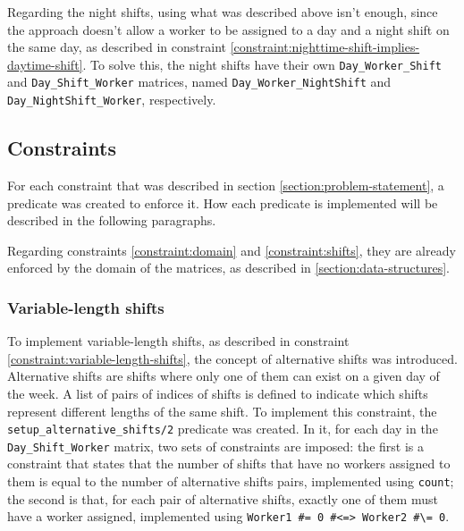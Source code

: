 \documentclass[conference]{IEEEtran}
\def\constraint#1{\vspace{4pt} {#1}}
\begin{document}
Regarding the night shifts, using what was described above isn't enough, since the approach doesn't allow a worker to be assigned to a day and a night shift on the same day, as described in constraint \ref{constraint:nighttime-shift-implies-daytime-shift}.
To solve this, the night shifts have their own \texttt{Day\_Worker\_Shift} and \texttt{Day\_Shift\_Worker} matrices, named \texttt{Day\_Worker\_NightShift} and \texttt{Day\_NightShift\_Worker}, respectively.

\subsection{Constraints}
\label{section:constraints}

For each constraint that was described in section \ref{section:problem-statement}, a predicate was created to enforce it. How each predicate is implemented will be described in the following paragraphs.

Regarding constraints \ref{constraint:domain} and \ref{constraint:shifts}, they are already enforced by the domain of the matrices, as described in \ref{section:data-structures}.

\constraint {
    \subsubsection*{Variable-length shifts}
    To implement variable-length shifts, as described in constraint \ref{constraint:variable-length-shifts}, the concept of alternative shifts was introduced. Alternative shifts are shifts where only one of them can exist on a given day of the week. A list of pairs of indices of shifts is defined to indicate which shifts represent different lengths of the same shift.
    To implement this constraint, the \texttt{setup\_alternative\_shifts/2} predicate was created. In it, for each day in the \texttt{Day\_Shift\_Worker} matrix, two sets of constraints are imposed: the first is a constraint that states that the number of shifts that have no workers assigned to them is equal to the number of alternative shifts pairs, implemented using \texttt{count}; the second is that, for each pair of alternative shifts, exactly one of them must have a worker assigned, implemented using \texttt{Worker1 \#= 0 \#<=> Worker2 \#\textbackslash= 0}.
}
\end{document}
